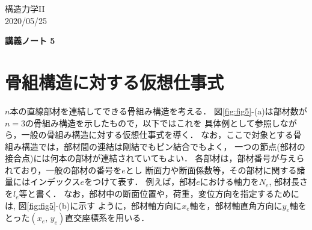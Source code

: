 \documentclass[10pt,a4j]{jarticle}
\newlength{\minitwocolumn}
\begin{document}
\newcommand{\fat}[1]{\mbox{\boldmath $#1$}}
\newcommand{\D}{\partial}
\newcommand{\w}{\omega}
\newcommand{\ga}{\alpha}
\newcommand{\gb}{\beta}
\newcommand{\gx}{\xi}
\newcommand{\gz}{\zeta}
\newcommand{\vhat}[1]{\hat{\fat{#1}}}
\newcommand{\spc}{\vspace{0.7\baselineskip}}
\newcommand{\halfspc}{\vspace{0.3\baselineskip}}

\newcommand{\twofig}[2]
 {
   \begin{figure}
     \begin{minipage}[t]{\minitwocolumn}
         \begin{center}   #1
         \end{center}
     \end{minipage}
         \hspace{\columnsep}
     \begin{minipage}[t]{\minitwocolumn}
         \begin{center} #2
         \end{center}
     \end{minipage}
   \end{figure}
 }
\begin{flushright}
	構造力学II\\
	2020/05/25
\end{flushright}
\begin{center}
	{\LARGE \bf 講義ノート 5} \\
\end{center}
\section{骨組構造に対する仮想仕事式}
$n$本の直線部材を連結してできる骨組み構造を考える．
図\ref{fig:fig5}-(a)は部材数が$n=3$の骨組み構造を示したもので，以下ではこれを
具体例として参照しながら，一般の骨組み構造に対する仮想仕事式を導く．
なお，ここで対象とする骨組み構造では，部材間の連結は剛結でもピン結合でもよく，
一つの節点(部材の接合点)には何本の部材が連結されていてもよい．
各部材は，部材番号が与えられており，一般の部材の番号を$e$とし
断面力や断面係数等，その部材に関する諸量にはインデックス$e$をつけて表す．
例えば，部材$e$における軸力を$N_e$, 部材長さを$l_e$等と書く．
なお，部材中の断面位置や，荷重，変位方向を指定するためには, 図\ref{fig:fig5}-(b)に示す
ように，部材軸方向に$x_e$軸を，部材軸直角方向に$y_e$軸をとった$(x_e,\,y_e)$直交座標系を用いる．
\end{document}
